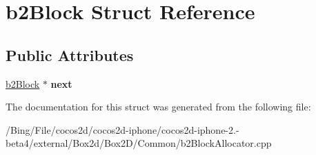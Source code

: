 \hypertarget{structb2_block}{\section{b2\-Block Struct Reference}
\label{structb2_block}
}
\subsection*{Public Attributes}
\begin{DoxyCompactItemize}
\item 
\hypertarget{structb2_block_a4b410d4fd7ad2a117c70776f60cb2738}{\hyperlink{structb2_block}{b2\-Block} $\ast$ {\bfseries next}}\label{structb2_block_a4b410d4fd7ad2a117c70776f60cb2738}

\end{DoxyCompactItemize}


The documentation for this struct was generated from the following file\-:\begin{DoxyCompactItemize}
\item 
/\-Bing/\-File/cocos2d/cocos2d-\/iphone/cocos2d-\/iphone-\/2.-\/beta4/external/\-Box2d/\-Box2\-D/\-Common/b2\-Block\-Allocator.\-cpp\end{DoxyCompactItemize}
